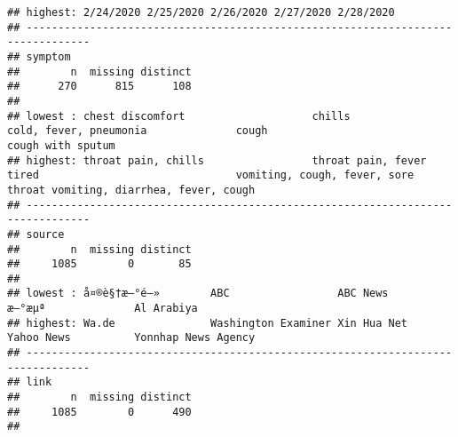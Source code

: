 \documentclass[
]{article}
\begin{document}
\begin{verbatim}
## highest: 2/24/2020 2/25/2020 2/26/2020 2/27/2020 2/28/2020
## --------------------------------------------------------------------------------
## symptom 
##        n  missing distinct 
##      270      815      108 
## 
## lowest : chest discomfort                    chills                              cold, fever, pneumonia              cough                               cough with sputum                  
## highest: throat pain, chills                 throat pain, fever                  tired                               vomiting, cough, fever, sore throat vomiting, diarrhea, fever, cough   
## --------------------------------------------------------------------------------
## source 
##        n  missing distinct 
##     1085        0       85 
## 
## lowest : å¤®è§†æ–°é—»        ABC                 ABC News            æ–°æµª              Al Arabiya         
## highest: Wa.de               Washington Examiner Xin Hua Net         Yahoo News          Yonnhap News Agency
## --------------------------------------------------------------------------------
## link 
##        n  missing distinct 
##     1085        0      490 
## 

\end{verbatim}
\end{document}
